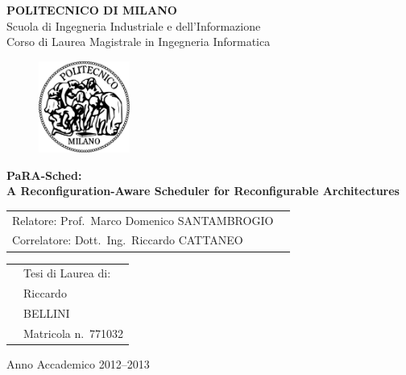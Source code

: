 \documentclass[a4paper]{report}
\begin{document}
\begin{titlepage}

\begin{center}
\LARGE
\textbf{POLITECNICO DI MILANO} \\
\Large
Scuola di Ingegneria Industriale e dell'Informazione \\
Corso di Laurea Magistrale in Ingegneria Informatica
\end{center}

\addvspace{1.5cm}
\begin{figure}[h]
\begin{center}
\includegraphics[width=3cm]{figure/PoliMi}
\end{center}
\end{figure}

\addvspace{0.75cm}
\begin{center}
\LARGE
\textbf{PaRA-Sched:\\
A Reconfiguration-Aware Scheduler for Reconfigurable Architectures}
\end{center}

\addvspace{4cm}
\Large
\begin{center}
\begin{tabular}{p{}p{}}
Relatore: Prof.~Marco Domenico SANTAMBROGIO& \\
Correlatore: Dott.~Ing.~Riccardo CATTANEO& \\ %
\end{tabular}
\end{center}

\addvspace{2cm}
\Large
\begin{center}
\begin{tabular}{p{}p{}}
& Tesi di Laurea di: \\
& Riccardo \\ 
& BELLINI \\
& Matricola n.~771032
\end{tabular}
\end{center}

\vfill
\Large
\begin{center}
Anno Accademico 2012--2013
\end{center}
\end{titlepage}
\end{document}
